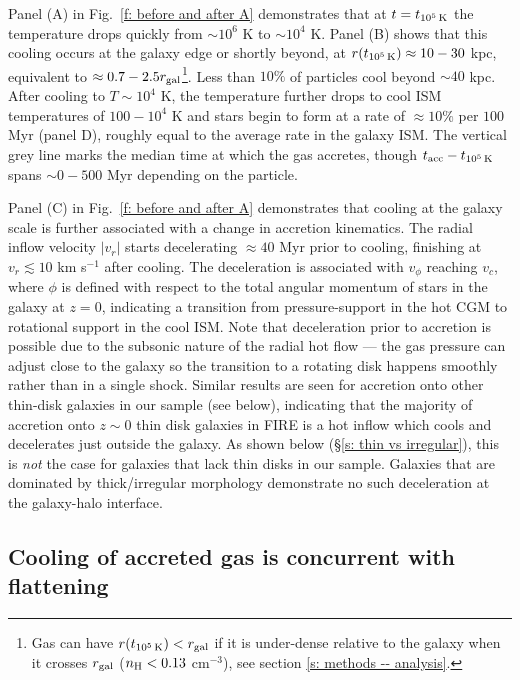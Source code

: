 \documentclass[fleqn,usenatbib]{mnras}
\newcommand{\tcools}{t_{10^5\,{\rm K}}}
\newcommand{\tacc}{t_{\rm acc}}
\begin{document}
Panel (A) in Fig.~\ref{f: before and after A} demonstrates that at $t = \tcools$ the temperature drops quickly from ${\sim}10^6$ K to ${\sim}10^4$ K.
Panel (B) shows that this cooling occurs at the galaxy edge or shortly beyond, at $r(\tcools) \approx 10-30$ kpc, equivalent to $\approx0.7 - 2.5 r_{\rm gal}$\footnote{Gas can have $r(\tcools) < r_{\rm gal}$ if it is under-dense relative to the galaxy when it crosses $r_{\rm gal}$ ($n_{\rm H} < 0.13$ cm$^{-3}$), see section \ref{s: methods -- analysis}.}.
Less than $10\%$ of particles cool beyond $\sim 40$ kpc.
After cooling to $T \sim 10^4$ K, the temperature further drops to cool ISM temperatures of $100-10^4$ K and stars begin to form at a rate of $\approx10\%$ per $100$ Myr (panel D), roughly equal to the average rate in the galaxy ISM. 
The vertical grey line marks the median time at which the gas accretes, though $\tacc - \tcools$ spans $\sim0-500$ Myr depending on the particle.

Panel (C) in Fig.~\ref{f: before and after A} demonstrates that cooling at the galaxy scale is further associated with a change in accretion kinematics.
The radial inflow velocity $\vert v_r \vert $ starts decelerating $\approx40$ Myr prior to cooling, finishing at $v_{r} \lesssim10$ km s$^{-1}$ after cooling.
The deceleration is associated with $v_\phi$ reaching $v_c$, where $\phi$ is defined with respect to the total angular momentum of stars in the galaxy at $z=0$, indicating a transition from pressure-support in the hot CGM to rotational support in the cool ISM.
Note that deceleration prior to accretion is possible due to the subsonic nature of the radial hot flow --- the gas pressure can adjust close to the galaxy so the transition to a rotating disk happens smoothly rather than in a single shock.
Similar results are seen for accretion onto other thin-disk galaxies in our sample (see below), indicating that the majority of accretion onto $z\sim0$ thin disk galaxies in FIRE is a hot inflow which cools and decelerates just outside the galaxy.
As shown below (\S\ref{s: thin vs irregular}), this is {\em not} the case for galaxies that lack thin disks in our sample. 
Galaxies that are dominated by thick/irregular morphology demonstrate no such deceleration at the galaxy-halo interface.


\subsection{Cooling of accreted gas is concurrent with flattening}
\label{s: characteristics -- aligns}
\end{document}
